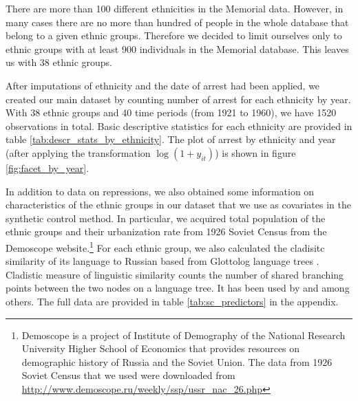 There are more than 100 different ethnicities in the Memorial data. 
However, in many cases there are no more than hundred of people in the whole database that belong to a given ethnic groups. 
Therefore we decided to limit ourselves only to ethnic groups with at least 900 individuals in the Memorial database. 
This leaves us with 38 ethnic groups. 


After imputations of ethnicity and the date of arrest had been applied,  we created our main dataset by counting number of arrest for each ethnicity by year. %
With 38  ethnic groups  and 40 time periods (from 1921 to 1960), we have 1520 observations in total. Basic descriptive statistics  for each ethnicity are provided in table \ref{tab:descr_stats_by_ethnicity}.  The plot of arrest by ethnicity and year (after applying the transformation $\log\left(1 + y_{it}\right)$) is shown in figure \ref{fig:facet_by_year}. 

In addition to data on repressions, we also obtained some information on characteristics of the  ethnic groups in our dataset that we use as covariates in the synthetic control method. 
In particular, we acquired total population of the ethnic groups and their urbanization rate from 1926 Soviet Census from the Demoscope website.\footnote{Demoscope is a project of Institute of Demography of the National Research University Higher School of Economics that provides resources on demographic history of Russia and the Soviet Union. The data from  1926 Soviet Census that we used  were downloaded from \url{http://www.demoscope.ru/weekly/ssp/ussr_nac_26.php}} For each ethnic group, we also calculated the cladisitc similarity of its language to Russian based from Glottolog language trees \citep{hammarstrom_glottolog_2018}.
Cladistic measure of linguistic similarity counts the number of shared branching points between the two nodes on a language tree. It has been used by \citet{fearon_ethnic_2003} and \citet{dickens_ethnolinguistic_2018} among others. 
The full data are provided in table \ref{tab:sc_predictors} in the appendix.


